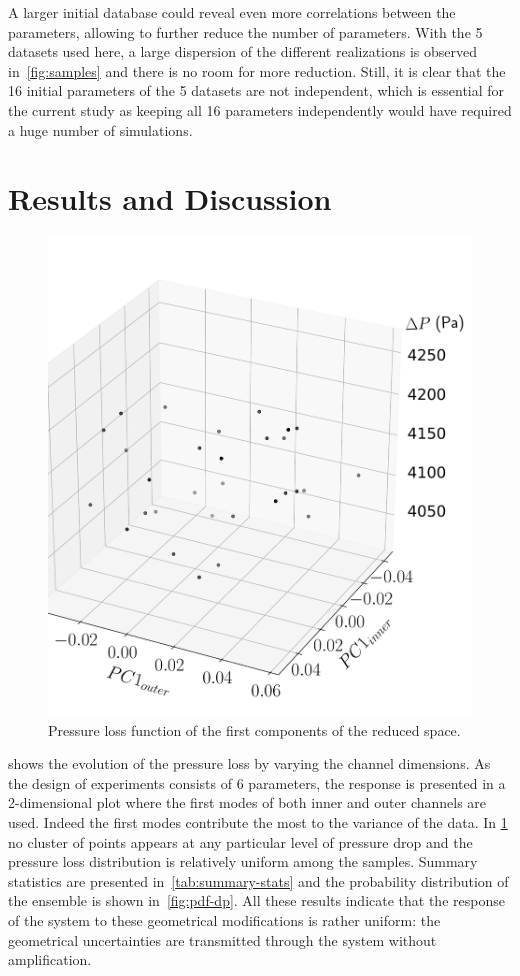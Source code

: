 A larger initial database could reveal even more correlations between the parameters, allowing to further reduce the number of parameters. With the 5 datasets used here, a large dispersion of the different realizations is observed in~\cref{fig:samples} and there is no room for more reduction. Still, it is clear that the 16 initial  parameters of the 5 datasets are not independent, which is essential for the current study as keeping all 16 parameters independently would have required a huge number of simulations.

\section{Results and Discussion}\label{sec:disc}

\begin{figure}[!ht]
\centering
\includegraphics[width=0.6\linewidth,keepaspectratio]{fig/applications/swirler/scatter_3D.pdf}
\caption{Pressure loss function of the first components of the reduced space.}
\label{fig:scatter-dp}
\end{figure}

 shows the evolution of the pressure loss by varying the channel dimensions. As the design of experiments consists of 6 parameters, the response is presented in a 2-dimensional plot where the first modes of both inner and outer channels are used. Indeed the first modes contribute the most to the variance of the data. In \cref{fig:scatter-dp} no cluster of points appears at any particular level of pressure drop and the pressure loss distribution is relatively uniform among the samples. Summary statistics are presented in~\cref{tab:summary-stats} and the probability distribution of the ensemble is shown in~\cref{fig:pdf-dp}.  All these results indicate that the response of the system to these geometrical modifications is rather uniform: the geometrical uncertainties are transmitted through the system without amplification.

